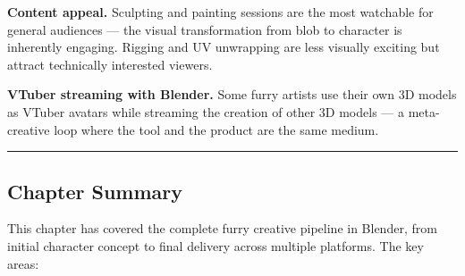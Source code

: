 \textbf{Content appeal.} Sculpting and painting sessions are the most watchable for general audiences --- the visual transformation from blob to character is inherently engaging. Rigging and UV unwrapping are less visually exciting but attract technically interested viewers.

\textbf{VTuber streaming with Blender.} Some furry artists use their own 3D models as VTuber avatars while streaming the creation of other 3D models --- a meta-creative loop where the tool and the product are the same medium.



\vspace{2em}
\begin{center}
\textcolor{bordergray}{\rule{0.6\textwidth}{0.5pt}}
\end{center}
\vspace{1em}

\subsection*{Chapter Summary}

This chapter has covered the complete furry creative pipeline in Blender, from initial character concept to final delivery across multiple platforms. The key areas:

